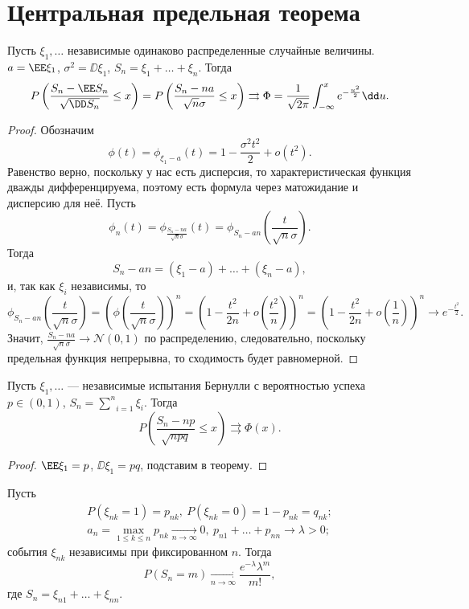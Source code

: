 \section{Центральная предельная теорема}

 \begin{theorem} Пусть
     $\xi_1, \ldots$ независимые одинаково распределенные случайные величины. $a= \EE \xi_1$,
     $\sigma^2 =  \DD\xi_1$, $S_n = \xi_1 + \ldots + \xi_n$.
     Тогда 
     $$P\left(\frac{S_n - \EE S_n}{\sqrt{ \DD S_n}}\le x\right) = P\left(\frac{S_n - na}{\sqrt{n}\sigma} \le x\right) \rightrightarrows \Phi =\frac{1}{\sqrt{2\pi}} \int_{-\infty}^x e^{-\frac{u^2}{2}}\dd u.$$
 \end{theorem}

 \begin{proof} Обозначим
     $$\phi(t) = \phi_{\xi_1 - a}(t) = 1-\frac{\sigma^2t^2}{2} + o(t^2).$$
     Равенство верно, поскольку у нас есть дисперсия, то характеристическая функция дважды дифференцируема, поэтому есть формула через матожидание и дисперсию для неё.
    Пусть
     $$\phi_n(t) = \phi_{\frac{S_n - na}{\sqrt{n}\sigma}}(t) = \phi_{S_n - an} (\frac{t}{\sqrt{n}\sigma}).$$
    Тогда
     $$S_n - an = (\xi_1 - a) + \ldots + (\xi_n - a),$$
     и, так как $\xi_i$ независимы, то
     $$\phi_{S_n - an}\left(\frac{t}{\sqrt{n}\sigma}\right) = \left(\phi\left(\frac{t}{\sqrt{n}\sigma}\right)\right)^n = \left(1 - \frac{t^2}{2n} +o\left(\frac{t^2}{n}\right)\right)^n = \left(1 - \frac{t^2}{2n} +o\left(\frac{1}{n}\right)\right)^n \rightarrow e^{-\frac{t^2}{2}}.$$
    Значит, $\frac{S_n - na}{\sqrt{n}\sigma} \rightarrow\mathcal{N}(0, 1)$ по распределению, следовательно, поскольку предельная функция непрерывна, то сходимость будет равномерной.
 \end{proof}

 \begin{corollary} Пусть
     $\xi_1, \ldots$ --- независимые испытания Бернулли с вероятностью успеха $p\in (0, 1)$, $S_n = \underset{i = 1}{\overset{n}{\sum}} \xi_i$.
     Тогда $$P\left(\frac{S_n - np}{\sqrt{npq}}\le x\right) \rightrightarrows \Phi(x).$$
 \end{corollary}

 \begin{proof}
     $\EE \xi_1 = p$, $ \DD\xi_1 = pq$, подставим в теорему.
 \end{proof}

 \begin{theorem}[Пуассона]
     Пусть 
     \begin{gather*}
         P(\xi_{nk} = 1) = p_{nk}, \ P(\xi_{nk} = 0) = 1- p_{nk} = q_{nk};\\
         a_n = \underset{1\le k\le n}{\max} p_{nk}\underset{n\rightarrow\infty}{\rightarrow} 0, \ p_{n1} +\ldots + p_{nn}\rightarrow \lambda > 0;
     \end{gather*}
    события $\xi_{nk}$ независимы при фиксированном $n$.
     Тогда 
     $$P(S_n = m)\underset{n\rightarrow\infty}{\rightarrow} \frac{e^{-\lambda} \lambda^m}{m!},$$
     где $S_n = \xi_{n1} + \ldots + \xi_{nn}$.
 \end{theorem}

